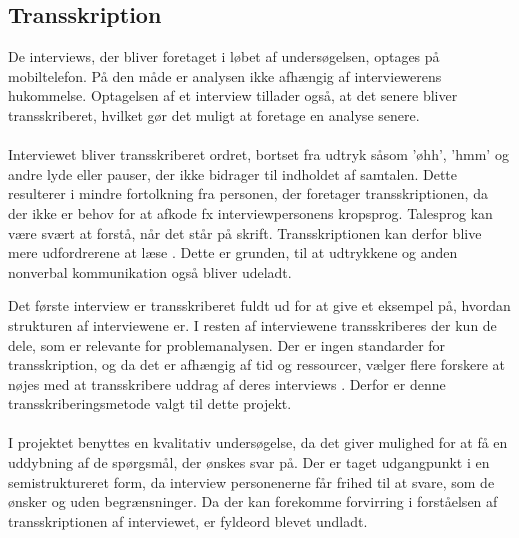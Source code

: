 \subsection{Transskription}
De interviews, der bliver foretaget i løbet af undersøgelsen, optages på mobiltelefon. På den måde er analysen ikke afhængig af interviewerens hukommelse. Optagelsen af et interview tillader også, at det senere bliver transskriberet, hvilket gør det muligt at foretage en analyse senere. 
\\
\\
Interviewet bliver transskriberet ordret, bortset fra udtryk såsom 'øhh', 'hmm' og andre lyde eller pauser, der ikke bidrager til indholdet af samtalen. Dette resulterer i mindre fortolkning fra personen, der foretager transskriptionen, da der ikke er behov for at afkode fx interviewpersonens kropsprog. Talesprog kan være svært at forstå, når det står på skrift. Transskriptionen kan derfor blive mere udfordrerene at læse \citep{kvale2015}. Dette er grunden, til at udtrykkene og anden nonverbal kommunikation også bliver udeladt. 
\par
Det første interview er transskriberet fuldt ud for at give et eksempel på, hvordan strukturen af interviewene er. I resten af interviewene transskriberes der kun de dele, som er relevante for problemanalysen. Der er ingen standarder for transskription, og da det er afhængig af tid og ressourcer, vælger flere forskere at nøjes med at transskribere uddrag af deres interviews \citep{brinkmann2014}\citep{kvale2015}. Derfor er denne transskriberingsmetode valgt til dette projekt.
\\\\
I projektet benyttes en kvalitativ undersøgelse, da det giver mulighed for at få en uddybning af de spørgsmål, der ønskes svar på. Der er taget udgangpunkt i en semistruktureret form, da interview personenerne får frihed til at svare, som de ønsker og uden begrænsninger. Da der kan forekomme forvirring i forståelsen af transskriptionen af interviewet, er fyldeord blevet undladt.

